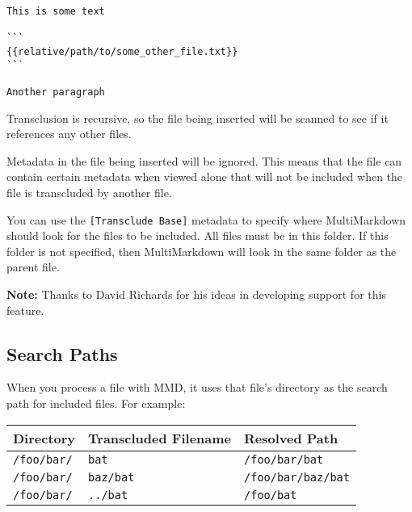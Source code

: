 \begin{verbatim}
This is some text

```
{{relative/path/to/some_other_file.txt}}
```

Another paragraph
\end{verbatim}

Transclusion is recursive, so the file being inserted will be scanned to see if it references any other files.

Metadata in the file being inserted will be ignored. This means that the file can contain certain metadata when viewed alone that will not be included when the file is transcluded by another file.

You can use the \texttt{[Transclude Base]} metadata to specify where MultiMarkdown should look for the files to be included. All files must be in this folder. If this folder is not specified, then MultiMarkdown will look in the same folder as the parent file.

\textbf{Note:} Thanks to David Richards for his ideas in developing support for this feature.

\subsection{Search Paths}
\label{searchpaths}

When you process a file with \gls{MMD}, it uses that file's directory as the search
path for included files. For example:

\begin{table}[htbp]
\begin{minipage}{\linewidth}
\setlength{\tymax}{0.5\linewidth}
\centering
\small
\begin{tabulary}{\textwidth}{@{}lll@{}} \toprule
 Directory	& Transcluded Filename	& Resolved Path 	\\
\midrule

 \texttt{\slash{}foo\slash{}bar\slash{}}	& \texttt{bat}	& \texttt{\slash{}foo\slash{}bar\slash{}bat}	\\
 \texttt{\slash{}foo\slash{}bar\slash{}}	& \texttt{baz\slash{}bat}	& \texttt{\slash{}foo\slash{}bar\slash{}baz\slash{}bat}	\\
 \texttt{\slash{}foo\slash{}bar\slash{}}	& \texttt{..\slash{}bat} 	& \texttt{\slash{}foo\slash{}bat}	\\
\bottomrule

\end{tabulary}
\end{minipage}
\end{table}

